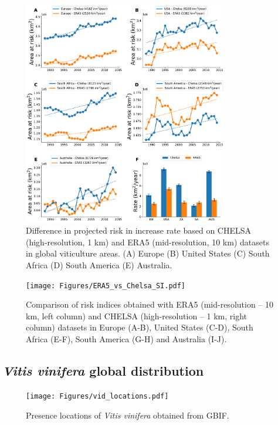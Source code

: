 \begin{figure}[H]
    \centering
    \includegraphics[width=0.8\textwidth]{Figures/area_risk.pdf}
    \caption{Difference in projected risk in increase rate based on CHELSA
        (high-resolution, 1 km) and ERA5 (mid-resolution, 10 km) datasets in
        global
        viticulture areas. (A) Europe (B) United States (C) South Africa (D)
        South
        America (E) Australia.}
    \label{fig:area_at_risk}
\end{figure}

\begin{figure}[H]
    \centering
    \texttt{[image: Figures/ERA5\_vs\_Chelsa\_SI.pdf]}
    \caption{Comparison of risk indices obtained with ERA5 (mid-resolution
        -- 10 km, left column) and CHELSA (high-resolution -- 1 km, right
        column)
        datasets in Europe (A-B), United States (C-D), South Africa (E-F),
        South
        America (G-H) and Australia (I-J).}
    \label{fig:ERA5_vs_chelsa}
\end{figure}

\subsection{\textit{Vitis vinifera} global distribution}

\begin{figure}[H]
    \centering
    \texttt{[image: Figures/vid\_locations.pdf]}
    \caption{Presence locations of \textit{Vitis vinifera} obtained from
        GBIF.}
    \label{fig:vid_locations}
\end{figure}
